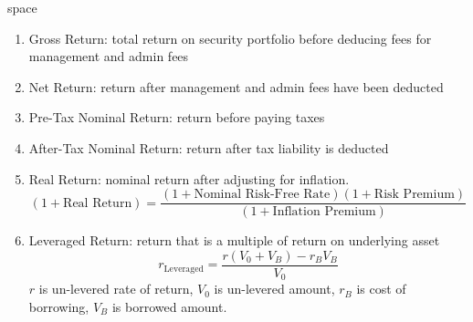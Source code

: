 \begin{definition} {\color{white}space}
\begin{enumerate}[label=\roman*.]
\setlength{\itemsep}{0pt}
\item Gross Return: total return on security portfolio before deducing fees for management and admin fees
\item Net Return: return after management and admin fees have been deducted
\item Pre-Tax Nominal Return: return before paying taxes
\item After-Tax Nominal Return: return after tax liability is deducted
\item Real Return: nominal return after adjusting for inflation.
\begin{equation}
(1 + \text{Real Return}) = \frac{(1 + \text{Nominal Risk-Free Rate}) (1 + \text{Risk Premium})}{(1 + \text{Inflation Premium})} \nonumber
\end{equation}
\item Leveraged Return: return that is a multiple of return on underlying asset
\begin{equation}
r_{\text{Leveraged}} = \frac{r(V_0 + V_B) - r_B V_B}{V_0} \nonumber
\end{equation}
$r$ is un-levered rate of return, $V_0$ is un-levered amount, $r_B$ is cost of borrowing, $V_B$ is borrowed amount.
\end{enumerate}
\end{definition}
